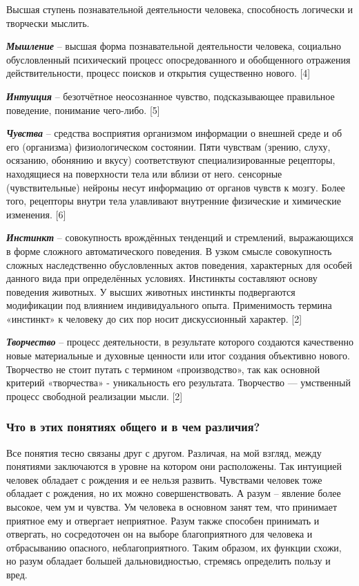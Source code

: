 \documentclass[14pt,a4paper,report]{report}
\begin{document}
Высшая ступень познавательной деятельности человека, способность логически и творчески мыслить.

\emph{\textbf{Мышление}} -- высшая форма познавательной деятельности человека, социально обусловленный психический процесс опосредованного и обобщенного отражения действительности, процесс поисков и открытия существенно нового. [4]

\emph{\textbf{Интуиция}} -- безотчётное неосознанное чувство, подсказывающее правильное поведение, понимание чего-либо. [5]

\emph{\textbf{Чувства}} -- средства восприятия организмом информации о внешней среде и об его (организма) физиологическом состоянии. Пяти чувствам (зрению, слуху, осязанию, обонянию и вкусу) соответствуют специализированные рецепторы, находящиеся на поверхности тела или вблизи от него. сенсорные (чувствительные) нейроны несут информацию от органов чувств к мозгу. Более того, рецепторы внутри тела улавливают внутренние физические и химические изменения. [6] 


\emph{\textbf{Инстинкт}} -- совокупность врождённых тенденций и стремлений, выражающихся в форме сложного автоматического поведения. В узком смысле совокупность сложных наследственно обусловленных актов поведения, характерных для особей данного вида при определённых условиях. Инстинкты составляют основу поведения животных. У высших животных инстинкты подвергаются модификации под влиянием индивидуального опыта. Применимость термина «инстинкт» к человеку до сих пор носит дискуссионный характер. [2]


\emph{\textbf{Творчество}} -- процесс деятельности, в результате которого создаются качественно новые материальные и духовные ценности или итог создания объективно нового. Творчество не стоит путать с термином «производство», так как основной критерий «творчества» - уникальность его результата. Творчество — умственный процесс свободной реализации мысли. [2]



\subsubsection{Что в этих понятиях общего и в чем различия?}

Все понятия тесно связаны друг с другом. Различая, на мой взгляд, между понятиями заключаются в уровне на котором они расположены. Так интуицией человек обладает с рождения и ее нельзя развить. Чувствами человек тоже обладает с рождения, но их можно совершенствовать. А разум – явление более высокое, чем ум и чувства. Ум человека в основном занят тем, что принимает приятное ему и отвергает неприятное. Разум также способен принимать и отвергать, но сосредоточен он на выборе благоприятного для человека и отбрасыванию опасного, неблагоприятного. Таким образом, их функции схожи, но разум обладает большей дальновидностью, стремясь определить пользу и вред.
\end{document}
